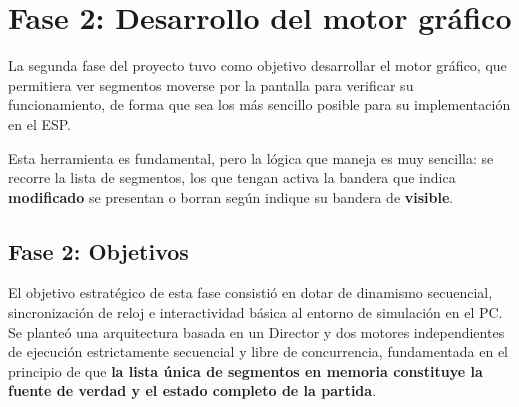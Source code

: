 \section{Fase 2: Desarrollo del motor gráfico}
\label{sec:ResumenFase2}

La segunda fase del proyecto tuvo como objetivo desarrollar el motor gráfico, que permitiera ver segmentos moverse por la pantalla para verificar su funcionamiento, de forma que sea los más sencillo posible para su implementación en el ESP. 

Esta herramienta es fundamental, pero la lógica que maneja es muy sencilla: se recorre la lista de segmentos, los que tengan activa la bandera que indica \textbf{modificado} se presentan o borran según indique su bandera de \textbf{visible}.

\subsection{Fase 2: Objetivos}
El objetivo estratégico de esta fase consistió en dotar de dinamismo secuencial, sincronización de reloj e interactividad básica al entorno de simulación en el PC. Se planteó una arquitectura basada en un Director y dos motores independientes de ejecución estrictamente secuencial y libre de concurrencia, fundamentada en el principio de que \textbf{la lista única de segmentos en memoria constituye la fuente de verdad y el estado completo de la partida}.

